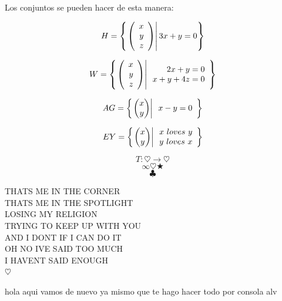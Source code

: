 \documentclass[10pt]{article}
\begin{document}
\problem{}

Los conjuntos se pueden hacer de esta manera:

$$H=\left\{ \left. \left( \begin{array}{r} x\\ y\\ z \end{array} \right) \right| 3x+y=0 \right\} $$

$$W=\left\{ \left. \left( \begin{array}{r} x\\ y\\ z \end{array} \right) \right| \begin{array}{r}
2x+y=0\\
x+y+4z=0\\
\end{array} \right\} $$

$$AG=\llaves{\vectrdos{x}{y}}{\begin{array}{r}
x-y=0\\


\end{array}}$$

$$EY=\left\{ \left. \begin{pmatrix} x\\ y\\ \end{pmatrix} \right| \begin{array}{r}
x\ loves\ y\\
y\ loves\ x\\
\end{array} \right\}$$

$$T : \heartsuit \rightarrow \heartsuit$$
$$\infty \heartsuit \bigstar $$
$$\clubsuit$$

THATS ME IN THE CORNER~\\
THATS ME IN THE SPOTLIGHT\\
LOSING MY RELIGION~\\
TRYING TO KEEP UP WITH YOU~\\
AND I DONT IF I CAN DO IT~\\
OH NO IVE SAID TOO MUCH~\\
I HAVENT SAID ENOUGH\\

$\heartsuit$

hola
aqui vamos de nuevo
ya mismo que te hago hacer todo por consola alv
\end{document}
